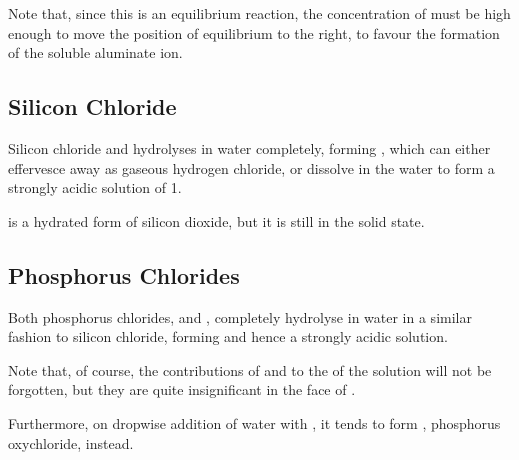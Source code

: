 
				Note that, since this is an equilibrium reaction, the concentration of  must be high enough to move the position of
				equilibrium to the right, to favour the formation of the soluble aluminate ion.





		\pagebreak
		\subsection{Silicon Chloride}

			Silicon chloride  and  hydrolyses in water completely, forming , which can either effervesce
			away as gaseous hydrogen chloride, or dissolve in the water to form a strongly acidic solution of \pH{} \num{1}.


			 is a hydrated form of silicon dioxide, but it is still in the solid state.




		\subsection{Phosphorus Chlorides}

			Both phosphorus chlorides,  and , completely hydrolyse in water in a similar fashion to silicon chloride,
			forming  and hence a strongly acidic solution.


			Note that, of course, the contributions of  and  to the \pH{} of the solution will not be
			forgotten, but they are quite insignificant in the face of .

			Furthermore, on dropwise addition of water with , it tends to form , phosphorus oxychloride, instead.

























